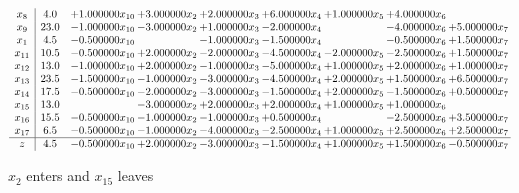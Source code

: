 \documentclass[10pt]{article}
\begin{document}
 \[\begin{array}{c| c c@{\hskip 2pt} c@{\hskip 2pt} c@{\hskip 2pt} c@{\hskip 2pt} c@{\hskip 2pt} c@{\hskip 2pt} c@{\hskip 2pt} }
 x_{8}   &  4.0 & + 1.000000 x_{10} & + 3.000000 x_{2} & + 2.000000 x_{3} & + 6.000000 x_{4} & + 1.000000 x_{5} & + 4.000000 x_{6} &   \\
 x_{9}   &  23.0 & -1.000000 x_{10} & -3.000000 x_{2} & + 1.000000 x_{3} & -2.000000 x_{4} &   & -4.000000 x_{6} & + 5.000000 x_{7}\\
 x_{1}   &  4.5 & -0.500000 x_{10} &   & -1.000000 x_{3} & -1.500000 x_{4} &   & -0.500000 x_{6} & + 1.500000 x_{7}\\
 x_{11}   &  10.5 & -0.500000 x_{10} & + 2.000000 x_{2} & -2.000000 x_{3} & -4.500000 x_{4} & -2.000000 x_{5} & -2.500000 x_{6} & + 1.500000 x_{7}\\
 x_{12}   &  13.0 & -1.000000 x_{10} & + 2.000000 x_{2} & -1.000000 x_{3} & -5.000000 x_{4} & + 1.000000 x_{5} & + 2.000000 x_{6} & + 1.000000 x_{7}\\
 x_{13}   &  23.5 & -1.500000 x_{10} & -1.000000 x_{2} & -3.000000 x_{3} & -4.500000 x_{4} & + 2.000000 x_{5} & + 1.500000 x_{6} & + 6.500000 x_{7}\\
 x_{14}   &  17.5 & -0.500000 x_{10} & -2.000000 x_{2} & -3.000000 x_{3} & -1.500000 x_{4} & + 2.000000 x_{5} & -1.500000 x_{6} & + 0.500000 x_{7}\\
 x_{15}   &  13.0  &   & -3.000000 x_{2} & + 2.000000 x_{3} & + 2.000000 x_{4} & + 1.000000 x_{5} & + 1.000000 x_{6} &   \\
 x_{16}   &  15.5 & -0.500000 x_{10} & -1.000000 x_{2} & -1.000000 x_{3} & + 0.500000 x_{4} &   & -2.500000 x_{6} & + 3.500000 x_{7}\\
 x_{17}   &  6.5 & -0.500000 x_{10} & -1.000000 x_{2} & -4.000000 x_{3} & -2.500000 x_{4} & + 1.000000 x_{5} & + 2.500000 x_{6} & + 2.500000 x_{7}\\
\hline
z    &  4.5 & -0.500000 x_{10} & + 2.000000 x_{2} & -3.000000 x_{3} & -1.500000 x_{4} & + 1.000000 x_{5} & + 1.500000 x_{6} & -0.500000 x_{7}\\
\end{array}\]


 $ x_{2} $ enters and $ x_{15} $ leaves 
\end{document}
